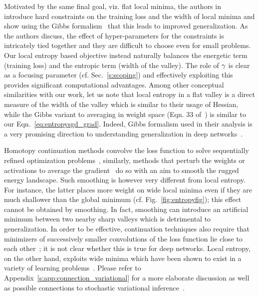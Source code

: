 \documentclass[10pt]{article}
\begin{document}
Motivated by the same final goal, viz. flat local minima, the authors in~\citet{hochreiter1997flat} introduce hard constraints on the training loss and the width of local minima and show using the Gibbs formalism~\citep{haussler1997mutual} that this leads to improved generalization. As the authors discuss, the effect of hyper-parameters for the constraints is intricately tied together and they are difficult to choose even for small problems. Our local entropy based objective instead naturally balances the energetic term (training loss) and the entropic term (width of the valley). The role of $\gamma$ is clear as a focusing parameter (cf. Sec.~\ref{s:scoping}) and effectively exploiting this provides significant computational advantages. Among other conceptual similarities with our work, let us note that local entropy in a flat valley is a direct measure of the width of the valley which is similar to their usage of Hessian, while the Gibbs variant to averaging in weight space (Eqn. 33 of~\citet{hochreiter1997flat}) is similar to our Eqn.~\eqref{eq:entropysgd_grad}. Indeed, Gibbs formalism used in their analysis is a very promising direction to understanding generalization in deep networks~\citep{zhang2016understanding}.

Homotopy continuation methods convolve the loss function to solve sequentially refined optimization problems~\citep{allgower2012numerical,mobahi2015link}, similarly, methods that perturb the weights or activations to average the gradient~\citep{gulcehre2016mollifying} do so with an aim to smooth the rugged energy landscape. Such smoothing is however very different from local entropy. For instance, the latter places more weight on wide local minima even if they are much shallower than the global minimum (cf. Fig.~\ref{fig:entropyfig}); this effect cannot be obtained by smoothing. In fact, smoothing can introduce an artificial minimum between two nearby sharp valleys which is detrimental to generalization. In order to be effective, continuation techniques also require that minimizers of successively smaller convolutions of the loss function lie close to each other~\citep{DBLP:conf/icml/HazanLS16}; it is not clear whether this is true for deep networks. Local entropy, on the other hand, exploits wide minima which have been shown to exist in a variety of learning problems~\citep{monasson1995weight,cocco1996analytical}. Please refer to Appendix~\ref{s:app:connection_variational} for a more elaborate discussion as well as possible connections to stochastic variational inference~\citep{blei2016variational}.
\end{document}
